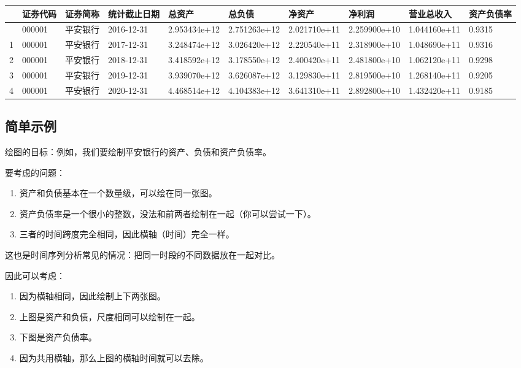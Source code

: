 \documentclass[
  letterpaper,
  DIV=11,
  numbers=noendperiod]{scrreprt}
\providecommand{\tightlist}{%
  \setlength{\itemsep}{0pt}\setlength{\parskip}{0pt}}\usepackage{longtable,booktabs,array}
\begin{document}
\begin{longtable}[]{@{}llllllllll@{}}
\toprule\noalign{}
& 证券代码 & 证券简称 & 统计截止日期 & 总资产 & 总负债 & 净资产 & 净利润
& 营业总收入 & 资产负债率 \\
\midrule\noalign{}
\endhead
\bottomrule\noalign{}
\endlastfoot
0 & 000001 & 平安银行 & 2016-12-31 & 2.953434e+12 & 2.751263e+12 &
2.021710e+11 & 2.259900e+10 & 1.044160e+11 & 0.9315 \\
1 & 000001 & 平安银行 & 2017-12-31 & 3.248474e+12 & 3.026420e+12 &
2.220540e+11 & 2.318900e+10 & 1.048690e+11 & 0.9316 \\
2 & 000001 & 平安银行 & 2018-12-31 & 3.418592e+12 & 3.178550e+12 &
2.400420e+11 & 2.481800e+10 & 1.062120e+11 & 0.9298 \\
3 & 000001 & 平安银行 & 2019-12-31 & 3.939070e+12 & 3.626087e+12 &
3.129830e+11 & 2.819500e+10 & 1.268140e+11 & 0.9205 \\
4 & 000001 & 平安银行 & 2020-12-31 & 4.468514e+12 & 4.104383e+12 &
3.641310e+11 & 2.892800e+10 & 1.432420e+11 & 0.9185 \\
\end{longtable}

\hypertarget{ux7b80ux5355ux793aux4f8b-2}{%
\subsection{简单示例}\label{ux7b80ux5355ux793aux4f8b-2}}

绘图的目标：例如，我们要绘制平安银行的资产、负债和资产负债率。

要考虑的问题：

\begin{enumerate}
\def\labelenumi{\arabic{enumi}.}
\tightlist
\item
  资产和负债基本在一个数量级，可以绘在同一张图。
\item
  资产负债率是一个很小的整数，没法和前两者绘制在一起（你可以尝试一下）。
\item
  三者的时间跨度完全相同，因此横轴（时间）完全一样。
\end{enumerate}

这也是时间序列分析常见的情况：把同一时段的不同数据放在一起对比。

因此可以考虑：

\begin{enumerate}
\def\labelenumi{\arabic{enumi}.}
\tightlist
\item
  因为横轴相同，因此绘制上下两张图。
\item
  上图是资产和负债，尺度相同可以绘制在一起。
\item
  下图是资产负债率。
\item
  因为共用横轴，那么上图的横轴时间就可以去除。
\end{enumerate}
\end{document}
